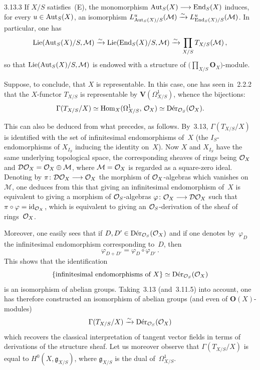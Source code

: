 \begin{corollary}{3.13.3}\label{II.3.13.3}
If \(X/S\) satisfies~(E), the monomorphism
\(\operatorname{Aut}_{S}(X)\longrightarrow\operatorname{End}_{S}(X)\)
induces, for every \(u\in\operatorname{Aut}_{S}(X)\), an isomorphism
\(L^{u}_{\operatorname{Aut}_{S}(X)/S}(\mathcal{M})
  \xrightarrow{\sim}
  L^{u}_{\operatorname{End}_{S}(X)/S}(\mathcal{M})\).
In particular, one has
\[
\operatorname{Lie}(\operatorname{Aut}_{S}(X)/S,\mathcal{M})
  \xrightarrow{\sim}
\operatorname{Lie}(\operatorname{End}_{S}(X)/S,\mathcal{M})
  \xrightarrow{\sim}
\prod_{X/S}T_{X/S}(\mathcal{M})\,,
\]
{\renewcommand{\thefootnote}{(46)}}
so that \(\operatorname{Lie}(\operatorname{Aut}_{S}(X)/S,\mathcal{M})\) is endowed with a structure of
\(\bigl(\prod_{X/S}\mathbf{O}_{X}\bigr)\)-module.
\end{corollary}

\label{II.3.14}
Suppose, to conclude, that \(X\) is representable.%
{\renewcommand{\thefootnote}{(47)}}
In this case, one has seen in~2.2.2 that the \(X\)-functor \(T_{X/S}\) is
representable by \(\mathbf{V}(\Omega^{1}_{X/S})\), whence the bijections:
\[
\Gamma(T_{X/S}/X)
  \simeq
\operatorname{Hom}_{X}(\Omega^{1}_{X/S},\,\mathcal{O}_X)
  \simeq
\mathrm{D\acute{e}r}_{\mathcal{O}_S}(\mathcal{O}_X).
\]

This can also be deduced from what precedes, as follows. By~3.13,
\(\Gamma(T_{X/S}/X)\) is identified with the set of infinitesimal
endomorphisms of~\(X\) (\ie the \(I_{S}\)-endomorphisms of \(X_{I_{S}}\)
inducing the identity on~\(X\)). Now \(X\) and \(X_{I_{S}}\) have the same
underlying topological space, the corresponding sheaves of rings being
\(\mathcal{O}_X\) and \(\mathcal{D}\mathcal{O}_X=\mathcal{O}_X\oplus\mathcal{M}\), where
\(\mathcal{M}=\mathcal{O}_X\) is regarded as a square-zero ideal. Denoting by
\(\pi\colon\mathcal{D}\mathcal{O}_X\longrightarrow\mathcal{O}_X\) the morphism of \(\mathcal{O}_X\)-algebras which
vanishes on~\(\mathcal{M}\), one deduces from this that giving an
infinitesimal endomorphism of~\(X\) is equivalent to giving a morphism of
\(\mathcal{O}_S\)-algebras \(\varphi\colon\mathcal{O}_X\longrightarrow\mathcal{D}\mathcal{O}_X\) such that
\(\pi\circ\varphi=\mathrm{id}_{\mathcal{O}_X}\), which is equivalent to giving an
\(\mathcal{O}_S\)-derivation of the sheaf of rings~\(\mathcal{O}_X\).

Moreover, one easily sees that if
\(D,D'\in\mathrm{D\acute{e}r}_{\mathcal{O}_S}(\mathcal{O}_X)\) and if one denotes
by~\(\varphi_{D}\) the infinitesimal endomorphism corresponding to~\(D\), then
\[
\varphi_{D+D'}=\varphi_{D}\circ\varphi_{D'}\,.
\]
This shows that the identification
\[
\{\text{infinitesimal endomorphisms of }X\}
  \simeq
\mathrm{D\acute{e}r}_{\mathcal{O}_S}(\mathcal{O}_X)
\]
is an isomorphism of abelian groups. Taking~3.13 (and~3.11.5) into account,
one has therefore constructed an isomorphism of abelian groups (and even of
\(\mathbf{O}(X)\)-modules)
\[
\Gamma(T_{X/S}/X)
  \xrightarrow{\sim}
\mathrm{D\acute{e}r}_{\mathcal{O}_S}(\mathcal{O}_X)
\]
which recovers the classical interpretation of tangent vector fields in terms
of derivations of the structure sheaf.%
{\renewcommand{\thefootnote}{(48)}}
Let us moreover observe that \(\Gamma(T_{X/S}/X)\) is equal to
\(H^{0}(X,\mathfrak{g}_{X/S})\), where \(\mathfrak{g}_{X/S}\) is the dual
of~\(\Omega^{1}_{X/S}\).

